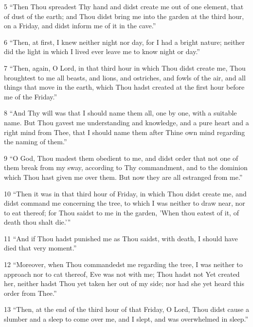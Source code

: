 \par 5 “Then Thou spreadest Thy hand and didst create me out of one element, that of dust of the earth; and Thou didst bring me into the garden at the third hour, on a Friday, and didst inform me of it in the cave.”

\par 6 “Then, at first, I knew neither night nor day, for I had a bright nature; neither did the light in which I lived ever leave me to know night or day.”

\par 7 “Then, again, O Lord, in that third hour in which Thou didst create me, Thou broughtest to me all beasts, and lions, and ostriches, and fowls of the air, and all things that move in the earth, which Thou hadst created at the first hour before me of the Friday.”

\par 8 “And Thy will was that I should name them all, one by one, with a suitable name. But Thou gavest me understanding and knowledge, and a pure heart and a right mind from Thee, that I should name them after Thine own mind regarding the naming of them.”

\par 9 “O God, Thou madest them obedient to me, and didst order that not one of them break from my sway, according to Thy commandment, and to the dominion which Thou hast given me over them. But now they are all estranged from me.”

\par 10 “Then it was in that third hour of Friday, in which Thou didst create me, and didst command me concerning the tree, to which I was neither to draw near, nor to eat thereof; for Thou saidst to me in the garden, 'When thou eatest of it, of death thou shalt die.'”

\par 11 “And if Thou hadst punished me as Thou saidst, with death, I should have died that very moment.”

\par 12 “Moreover, when Thou commandedst me regarding the tree, I was neither to approach nor to cat thereof, Eve was not with me; Thou hadst not Yet created her, neither hadst Thou yet taken her out of my side; nor had she yet heard this order from Thee.”

\par 13 “Then, at the end of the third hour of that Friday, O Lord, Thou didst cause a slumber and a sleep to come over me, and I slept, and was overwhelmed in sleep.”

